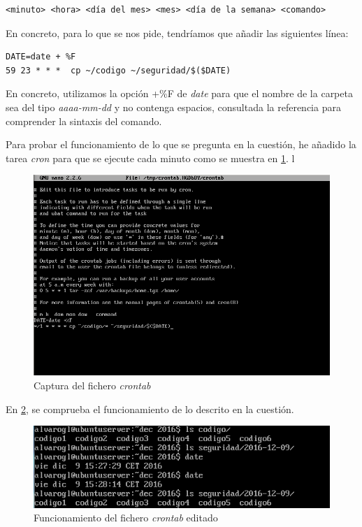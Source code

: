 \begin{verbatim}
<minuto> <hora> <día del mes> <mes> <día de la semana> <comando>
\end{verbatim}

En concreto, para lo que se nos pide, tendríamos que añadir las siguientes línea:

\begin{verbatim}
DATE=date + %F
59 23 * * *  cp ~/codigo ~/seguridad/$($DATE)
\end{verbatim}

En concreto, utilizamos la opción +\%F de \textit{date} para que el nombre de la carpeta sea del tipo \textit{aaaa-mm-dd} y no contenga espacios, consultada la referencia \cite{date} para comprender la sintaxis del comando.

Para probar el funcionamiento de lo que se pregunta en la cuestión, he añadido la tarea \textit{cron} para que se ejecute cada minuto como se muestra en \ref{crontab}.
l
\begin{figure}[H]
	\centering
	\includegraphics[scale=0.6]{cuestion2-crontab.png}
	\caption{Captura del fichero \textit{crontab}} \label{crontab}
\end{figure}  

En \ref{resultado-cron}, se comprueba el funcionamiento de lo descrito en la cuestión.

\begin{figure}[H]
	\centering
	\includegraphics[scale=0.6]{cuestion2-resultado.png}
	\caption{Funcionamiento del fichero \textit{crontab} editado} \label{resultado-cron}
\end{figure}


